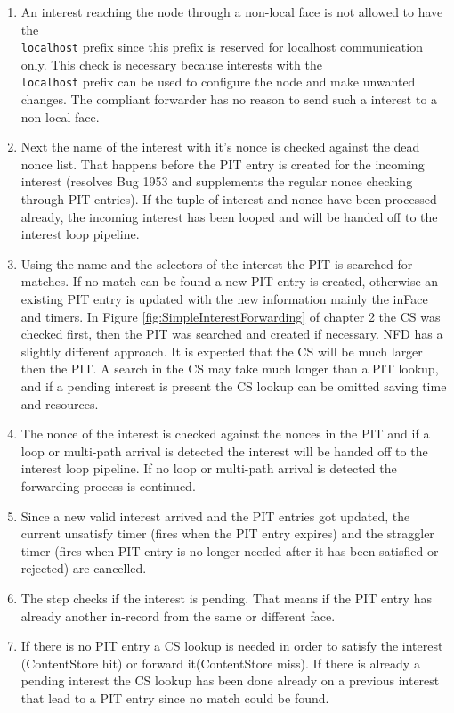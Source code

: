 \begin{enumerate}
\item An interest reaching the node through a non-local face is not allowed to have the \texttt{\\localhost} prefix since this prefix is reserved for localhost communication only. This check is necessary because interests with the \texttt{\\localhost} prefix can be used to configure the node and make unwanted changes. The compliant forwarder has no reason to send such a interest to a non-local face.
\item Next the name of the interest with it's nonce is checked against the dead nonce list. That happens before the PIT entry is created for the incoming interest (resolves Bug 1953 and supplements the regular nonce checking through PIT entries). If the tuple of interest and nonce have been processed already, the incoming interest has been looped and will be handed off to the interest loop pipeline.
\item Using the name and the selectors of the interest the PIT is searched for matches. If no match can be found a new PIT entry is created, otherwise an existing PIT entry is updated with the new information mainly the inFace and timers. In Figure \ref{fig:SimpleInterestForwarding} of chapter 2 the CS was checked first, then the PIT was searched and created if necessary. NFD has a slightly different approach. It is expected that the CS will be much larger then the PIT. A search in the CS may take much longer than a PIT lookup, and if a pending interest is present the CS lookup can be omitted saving time and resources.
\item The nonce of the interest is checked against the nonces in the PIT and if a loop or multi-path arrival is detected the interest will be handed off to the interest loop pipeline. If no loop or multi-path arrival is detected the forwarding process is continued.
\item Since a new valid interest arrived and the PIT entries got updated, the current unsatisfy timer (fires when the PIT entry expires) and the straggler timer (fires when PIT entry is no longer needed after it has been satisfied or rejected) are cancelled.
\item The step checks if the interest is pending. That means if the PIT entry has already another in-record from the same or different face.
\item If there is no PIT entry a CS lookup is needed in order to satisfy the interest (ContentStore hit) or forward it(ContentStore miss). If there is already a pending interest the CS lookup has been done already on a previous interest that lead to a PIT entry since no match could be found.
\end{enumerate}

